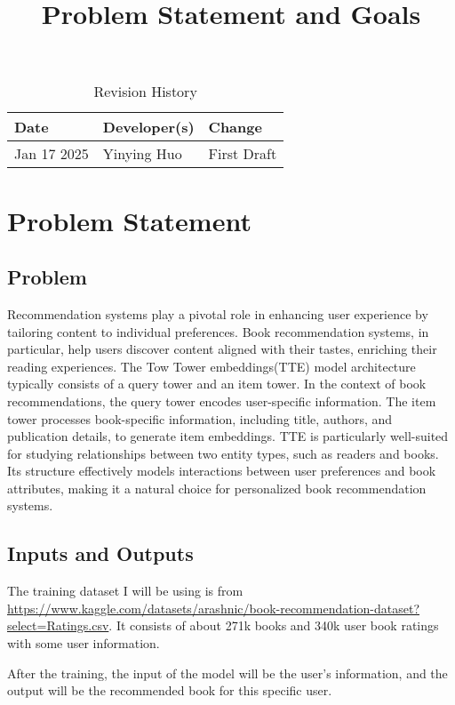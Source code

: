 \documentclass{article}
\title{Problem Statement and Goals\\\progname}
\author{\authname}
\date{}
\begin{document}
\maketitle

\begin{table}[hp]
\caption{Revision History} \label{TblRevisionHistory}
\begin{tabularx}{\textwidth}{llX}
\toprule
\textbf{Date} & \textbf{Developer(s)} & \textbf{Change}\\
\midrule
Jan 17 2025 & Yinying Huo & First Draft \\
\bottomrule
\end{tabularx}
\end{table}

\section{Problem Statement}

\subsection{Problem}
Recommendation systems play a pivotal role in enhancing user experience by tailoring content to individual preferences. Book recommendation systems, in particular, help users discover content aligned with their tastes, enriching their reading experiences. The Tow Tower embeddings(TTE) model architecture typically consists of a query tower and an item tower. In the context of book recommendations, the query tower encodes user-specific information. The item tower processes book-specific information, including title, authors, and publication details, to generate item embeddings. TTE is particularly well-suited for studying relationships between two entity types, such as readers and books. Its structure effectively models interactions between user preferences and book attributes, making it a natural choice for personalized book recommendation systems.

\subsection{Inputs and Outputs}

The training dataset I will be using is from \url{https://www.kaggle.com/datasets/arashnic/book-recommendation-dataset?select=Ratings.csv}. It consists of about 271k books and 340k user book ratings with some user information.

After the training, the input of the model will be the user's information, and the output will be the recommended book for this specific user.
\end{document}
